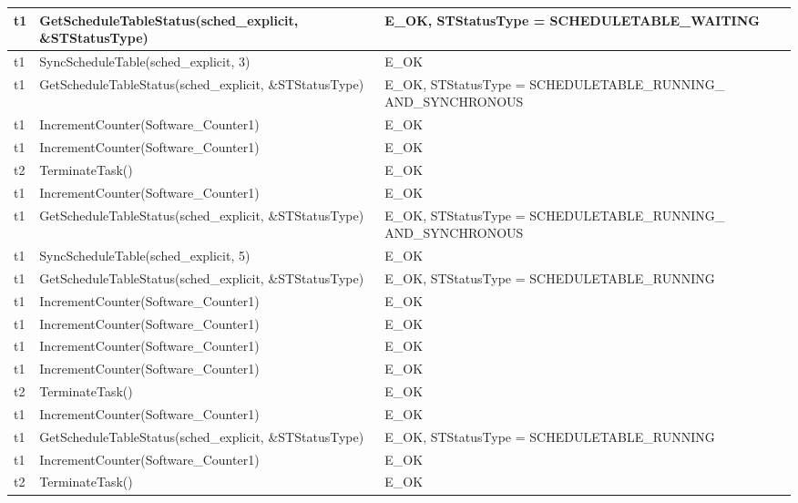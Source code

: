 \documentclass[10pt]{article}
\newlength{\Li}\settowidth{\Li}{Running}
\newlength{\Lii}\setlength{\Lii}{7cm}
\newlength{\Liiii}\setlength{\Liiii}{0.9cm}
\newlength{\Liii}\setlength{\Liii}{\textwidth} \addtolength{\Liii}{-\Li} \addtolength{\Liii}{-\Lii} \addtolength{\Liii}{-\Liiii}
\begin{document}
	\begin{supertabular}{|p{\Li}|p{\Lii}|p{\Liii}|p{\Liiii}|} \hline 
	t1		& GetScheduleTableStatus(sched\_explicit, \&STStatusType)			& E\_OK, STStatusType = SCHEDULETABLE\_WAITING								& \\ \hline
	t1		& SyncScheduleTable(sched\_explicit, 3)							& E\_OK																	& \\ \hline
	t1		& GetScheduleTableStatus(sched\_explicit, \&STStatusType)			& E\_OK, STStatusType = SCHEDULETABLE\_RUNNING\_ AND\_SYNCHRONOUS		& \\ \hline
	t1		& IncrementCounter(Software\_Counter1)						& E\_OK																	& \\ \hline
	t1		& IncrementCounter(Software\_Counter1)						& E\_OK																	& \\ \hline
	t2		& TerminateTask()											& E\_OK																	& \\ \hline
	t1		& IncrementCounter(Software\_Counter1)						& E\_OK																	& \\ \hline
	t1		& GetScheduleTableStatus(sched\_explicit, \&STStatusType)			& E\_OK, STStatusType = SCHEDULETABLE\_RUNNING\_ AND\_SYNCHRONOUS		& \\ \hline
	t1		& SyncScheduleTable(sched\_explicit, 5)							& E\_OK																	& \\ \hline
	t1		& GetScheduleTableStatus(sched\_explicit, \&STStatusType)			& E\_OK, STStatusType = SCHEDULETABLE\_RUNNING 							& \\ \hline
	t1		& IncrementCounter(Software\_Counter1)						& E\_OK																	& \\ \hline
	t1		& IncrementCounter(Software\_Counter1)						& E\_OK																	& \\ \hline
	t1		& IncrementCounter(Software\_Counter1)						& E\_OK																	& \\ \hline
	t1		& IncrementCounter(Software\_Counter1)						& E\_OK																	& \\ \hline
	t2		& TerminateTask()											& E\_OK																	& \\ \hline
	t1		& IncrementCounter(Software\_Counter1)						& E\_OK																	& \\ \hline
	t1		& GetScheduleTableStatus(sched\_explicit, \&STStatusType)			& E\_OK, STStatusType = SCHEDULETABLE\_RUNNING 							& \\ \hline
	t1		& IncrementCounter(Software\_Counter1)						& E\_OK																	& \\ \hline
	t2		& TerminateTask()											& E\_OK																	& \\ \hline

\end{supertabular}
\end{document}

